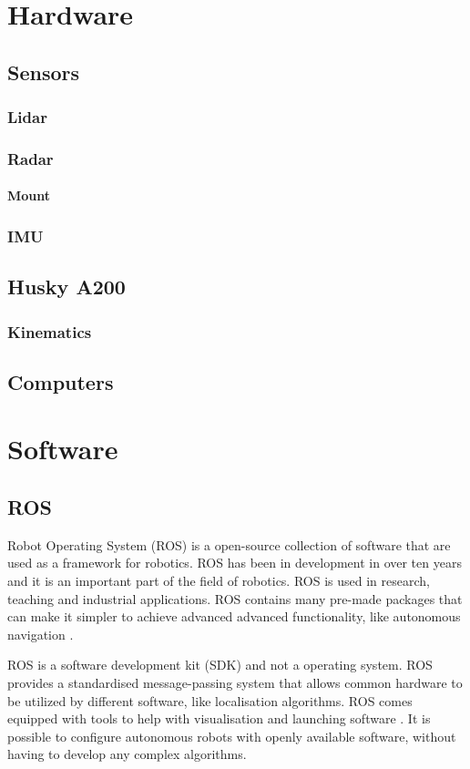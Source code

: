 \chapter{Hardware}
\section{Sensors}
\subsection{Lidar}

\subsection{Radar}
\subsubsection{Mount}
\subsection{IMU}
\section{Husky A200}
\subsection{Kinematics}
\section{Computers}


\chapter{Software}
\section{ROS}
Robot Operating System (ROS) is a open-source collection of software that are used as a framework for robotics. ROS has been in development in over ten years and it is an important part of the field of robotics. ROS is used in research, teaching and industrial applications. ROS contains many pre-made packages that can make it simpler to achieve advanced advanced functionality, like autonomous navigation \cite{WhyROS}. 

ROS is a software development kit (SDK) and not a operating system. ROS provides a standardised message-passing system that allows common hardware to be utilized by different software, like localisation algorithms. ROS comes equipped with tools to help with visualisation and launching software \cite{ROSEcosystem}. It is possible to configure autonomous robots with openly available software, without having to develop any complex algorithms.

